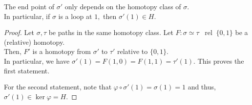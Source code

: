 \documentclass[12pt]{article}
\newcommand{\rel}{\;\;\operatorname{rel}\;}
\begin{document}
\begin{cor} \label{cor:endpthomot}
	The end point of $\sigma'$ only depends on the homotopy class of $\sigma.$\\
	In particular, if $\sigma$ is a loop at $1,$ then $\sigma'(1) \in H.$
\end{cor}
\begin{proof} 
	Let $\sigma, \tau$ be paths in the same homotopy class. Let $F:\sigma \simeq \tau \rel \{0, 1\}$ be a (relative) homotopy.\\
	Then, $F'$ is a homotopy from $\sigma'$ to $\tau'$ relative to $\{0, 1\}.$\\
	In particular, we have $\sigma'(1) = F(1, 0) = F(1, 1) = \tau'(1).$ This proves the first statement.

	For the second statement, note that $\varphi\circ\sigma'(1) = \sigma(1) = 1$ and thus, $\sigma'(1) \in \ker\varphi = H.$
\end{proof}
\end{document}
